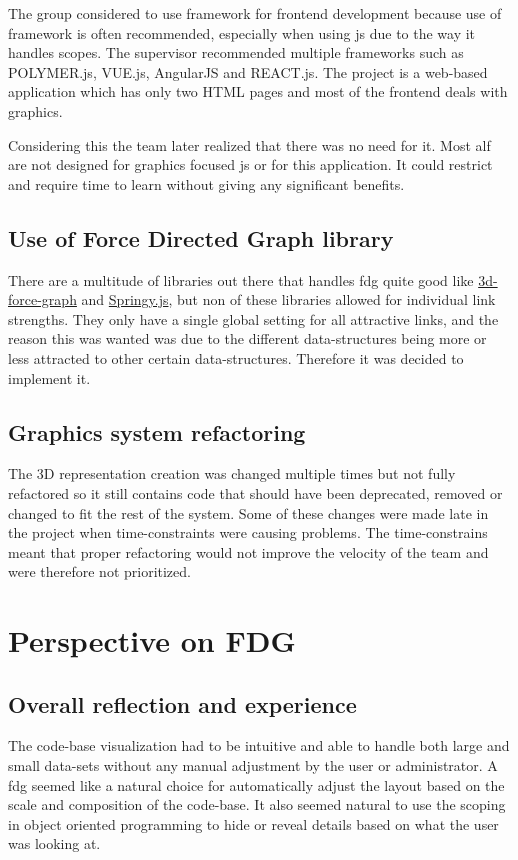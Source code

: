 The group considered to use framework for \gls{frontend} development because use of framework is often recommended, especially when using \Gls{js} due to the way it handles scopes. The supervisor recommended multiple frameworks such as POLYMER.js, VUE.js, AngularJS and REACT.js. The project is a web-based application which has only two HTML pages and most of the \gls{frontend} deals with graphics.

Considering this the team later realized that there was no need for it. Most \gls{alf} are not designed for graphics focused \gls{js} or for this application. It could restrict and require time to learn without giving any significant benefits.

\subsection{Use of Force Directed Graph library}
There are a multitude of libraries out there that handles \gls{fdg} quite good like \href{https://www.npmjs.com/package/3d-force-graph}{3d-force-graph} and \href{http://getspringy.com/}{Springy.js}, but non of these libraries allowed for individual link strengths. They only have a single global setting for all attractive links, and the reason this was wanted was due to the different data-structures being more or less attracted to other certain data-structures. Therefore it was decided to implement it. 

\subsection{Graphics system refactoring}
The 3D representation creation was changed multiple times but not fully refactored so it still contains code that should have been deprecated, removed or changed to fit the rest of the system. Some of these changes were made late in the project when time-constraints were causing problems. The time-constrains meant that proper refactoring would not improve the velocity of the team and were therefore not prioritized.

\section{Perspective on FDG}
\subsection{Overall reflection and experience}

The code-base visualization had to be intuitive and able to handle both large and small data-sets without any manual adjustment by the user or administrator. A \gls{fdg} seemed like a natural choice for automatically adjust the layout based on the scale and composition of the code-base. It also seemed natural to use the scoping in object oriented programming to hide or reveal details based on what the user was looking at.


